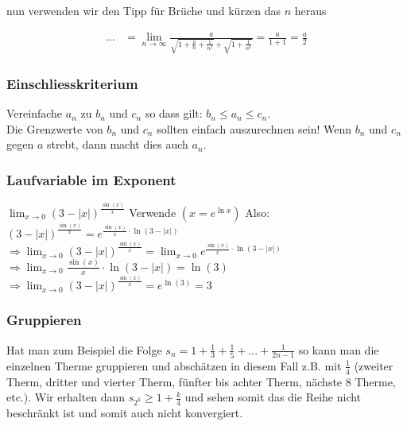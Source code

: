 nun verwenden wir den Tipp für Brüche und kürzen das $n$ heraus

\begin{align*}
\ldots &= \lim_{n \to \infty} \frac{a}{\sqrt{1 + \frac{a}{n} + \frac{1}{n^2}} +
\sqrt{1 + \frac{1}{n^2}}} = \frac{a}{1 + 1} = \frac{a}{2}
\end{align*}

\subsubsection{Einschliesskriterium}
Vereinfache $a_n$ zu $b_n$ und $c_n$ so dass gilt: $b_n \leq a_n \leq c_n$. \\
Die Grenzwerte von $b_n$ und $c_n$ sollten einfach auszurechnen sein! 
Wenn $b_n$ und $c_n$ gegen $a$ strebt, dann macht dies auch $a_n$.

\subsubsection{Laufvariable im Exponent}
$\lim_{x \to 0} (3 - |x|)^{\frac{\sin(x)}{x}}$\newline
Verwende $(x = e^{\ln x})$ Also: $(3 - |x|)^{\frac{\sin(x)}{x}} = e^{\frac{\sin(x)}{x} \cdot \ln(3 -
|x|)}$\newline
$\Rightarrow 
\lim_{x \to 0} (3 - |x|)^{\frac{\sin(x)}{x}} = \lim_{x \to 0}e^{\frac{\sin(x)}{x} \cdot \ln(3 -
|x|)}$\newline
$\Rightarrow \lim_{x \to 0}\frac{\sin(x)}{x}\cdot \ln(3-|x|) = \ln(3)$\newline
$\Rightarrow \lim_{x \to 0}(3 - |x|)^{\frac{\sin(x)}{x}} = e^{\ln(3)} = 3$


\subsubsection{Gruppieren}
Hat man zum Beispiel die Folge $s_n = 1 + \frac{1}{3} + \frac{1}{5} + ... + \frac{1}{2n-1}$ so kann man die 
einzelnen Therme gruppieren und abschätzen in diesem Fall z.B. mit $\frac{1}{4}$ (zweiter Therm, dritter und vierter Therm,
fünfter bis achter Therm, nächste 8 Therme, etc.). Wir erhalten dann $s_{2^k} \geq 1 + \frac{k}{4}$ und sehen somit das die 
Reihe nicht beschränkt ist und somit auch nicht konvergiert.